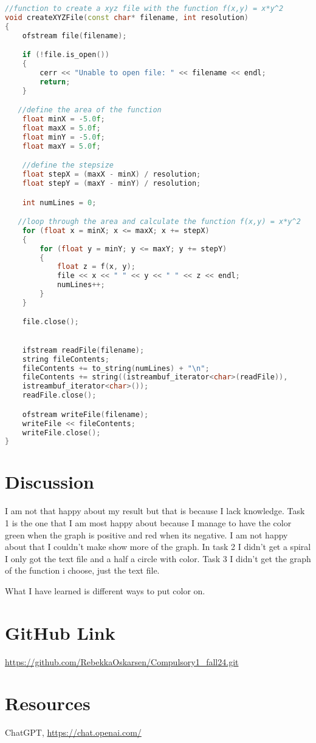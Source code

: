 \documentclass[12pt]{article}
\begin{document}
\begin{lstlisting}[language=C++, caption={Text file}]
//function to create a xyz file with the function f(x,y) = x*y^2
void createXYZFile(const char* filename, int resolution) 
{
    ofstream file(filename);

    if (!file.is_open()) 
    {
        cerr << "Unable to open file: " << filename << endl;
        return;
    }

   //define the area of the function
    float minX = -5.0f;
    float maxX = 5.0f;
    float minY = -5.0f;
    float maxY = 5.0f;

    //define the stepsize
    float stepX = (maxX - minX) / resolution;
    float stepY = (maxY - minY) / resolution;

    int numLines = 0;

   //loop through the area and calculate the function f(x,y) = x*y^2
    for (float x = minX; x <= maxX; x += stepX) 
    {
        for (float y = minY; y <= maxY; y += stepY) 
        {
            float z = f(x, y);
            file << x << " " << y << " " << z << endl;
            numLines++;
        }
    }

    file.close();

   
    ifstream readFile(filename);
    string fileContents;
    fileContents += to_string(numLines) + "\n";
    fileContents += string((istreambuf_iterator<char>(readFile)), 
    istreambuf_iterator<char>());
    readFile.close();

    ofstream writeFile(filename);
    writeFile << fileContents;
    writeFile.close();
}
\end{lstlisting}

\section{Discussion}
I am not that happy about my result but that is because I lack knowledge. Task 1 is the one that I am most happy about because I manage to have the color green when the graph is positive and red when its negative. I am not happy about that I couldn't make show more of the graph.
In task 2 I didn't get a spiral I only got the text file and a half a circle with color.
Task 3 I didn't get the graph of the function i choose, just the text file.

What I have learned is different ways to put color on. 

\section{GitHub Link}
\url{https://github.com/RebekkaOskarsen/Compulsory1_fall24.git}

\section{Resources}
ChatGPT, \url{https://chat.openai.com/}
\end{document}
